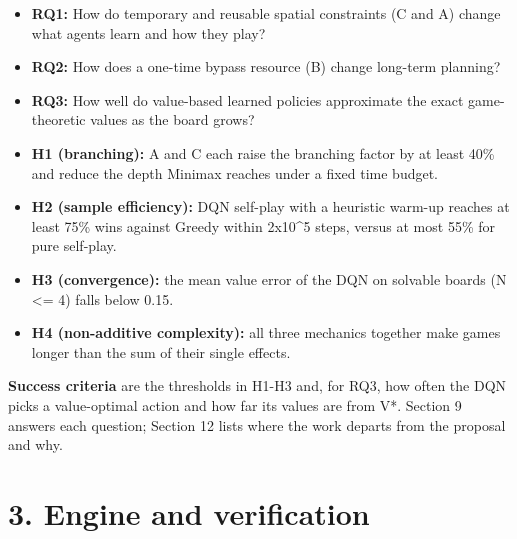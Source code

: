 \documentclass[11pt]{article}
\begin{document}
\begin{itemize}
\item \textbf{RQ1:} How do temporary and reusable spatial constraints (C and A) change what agents learn
and how they play?
\item \textbf{RQ2:} How does a one-time bypass resource (B) change long-term planning?
\item \textbf{RQ3:} How well do value-based learned policies approximate the exact game-theoretic values
as the board grows?
\item \textbf{H1 (branching):} A and C each raise the branching factor by at least 40\% and reduce the
depth Minimax reaches under a fixed time budget.
\item \textbf{H2 (sample efficiency):} DQN self-play with a heuristic warm-up reaches at least 75\% wins
against Greedy within 2x10\textasciicircum{}5 steps, versus at most 55\% for pure self-play.
\item \textbf{H3 (convergence):} the mean value error of the DQN on solvable boards (N <= 4) falls below
0.15.
\item \textbf{H4 (non-additive complexity):} all three mechanics together make games longer than the sum
of their single effects.
\end{itemize}

\textbf{Success criteria} are the thresholds in H1-H3 and, for RQ3, how often the DQN picks a
value-optimal action and how far its values are from V*. Section 9 answers each question;
Section 12 lists where the work departs from the proposal and why.

\section{3. Engine and verification}
\end{document}
